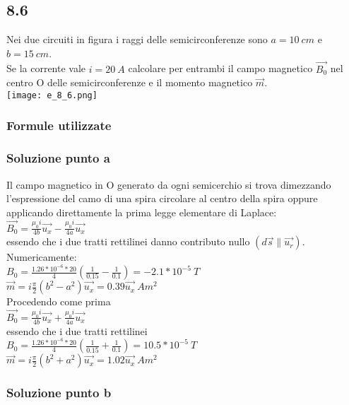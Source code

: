 \documentclass[../../main.tex]{subfiles}
\begin{document}
\subsection*{8.6}
Nei due circuiti in figura i raggi delle semicirconferenze sono $a=10\ cm$ e $b=15\ cm$.
\\Se la corrente vale $i = 20\ A$ calcolare per entrambi il campo magnetico $\vec{B_0}$ nel centro O delle semicirconferenze e il momento magnetico $\vec{m}$.
\\\texttt{[image: e\_8\_6.png]}
\subsubsection*{Formule utilizzate}
\subsubsection*{Soluzione punto a}
Il campo magnetico in O generato da ogni semicerchio si trova dimezzando l'espressione del camo di una spira circolare al centro della spira oppure applicando direttamente la prima legge elementare di Laplace:
\\$\vec{B_0} = \frac{\mu_0 i}{4b}\vec{u_x}-\frac{\mu_0 i}{4a}\vec{u_x}$
\\essendo che i due tratti rettilinei danno contributo nullo $(d\vec{s} \parallel \vec{u_r})$. Numericamente:
\\$B_0 = \frac{1.26 * 10^{-6} * 20}{4}\left(\frac{1}{0.15}-\frac{1}{0.1}\right) = -2.1 * 10^{-5}\ T$
\\$\vec{m} = i\frac{\pi}{2}\left(b^2 - a^2\right)\vec{u_x}=0.39\vec{u_x}\ Am^2$
\\Procedendo come prima
\\$\vec{B_0} = \frac{\mu_0 i}{4b}\vec{u_x}+\frac{\mu_0 i}{4a}\vec{u_x}$
\\essendo che i due tratti rettilinei
\\$B_0 = \frac{1.26 * 10^{-6} * 20}{4}\left(\frac{1}{0.15}+\frac{1}{0.1}\right) = 10.5* 10^{-5}\ T$
\\$\vec{m} = i\frac{\pi}{2}\left(b^2 + a^2\right)\vec{u_x}=1.02\vec{u_x}\ Am^2$

\subsubsection*{Soluzione punto b}
\newpage
\end{document}
